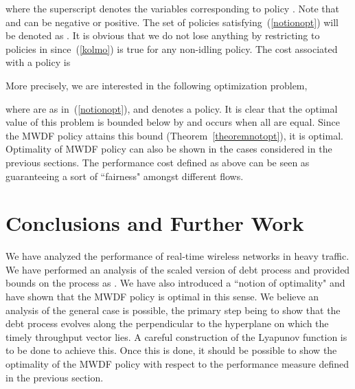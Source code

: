\documentclass[letterpaper, 10 pt, conference]{ieeeconf}
\begin{document}
where the superscript denotes the variables corresponding to policy . Note that  and  can be negative or positive. The set of policies satisfying~(\ref{notionopt}) will be denoted as . It is obvious that we do not lose anything by restricting to policies in  since~(\ref{kolmo}) is true for any non-idling policy. The cost associated with a policy is
 
More precisely, we are interested in the following optimization problem,

where  are as in~(\ref{notionopt}), and  denotes a policy. It is clear that the optimal value of this problem is bounded below by  and occurs when all  are equal. Since the MWDF policy attains this bound (Theorem~\ref{theoremnotopt}), it is optimal.\\
Optimality of MWDF policy can also be shown in the cases considered in the previous sections. The performance cost defined as above can be seen as guaranteeing a sort of ``fairness" amongst different flows.
\section{Conclusions and Further Work}\label{sec:conclusion} 
 We have analyzed the performance of real-time wireless networks in heavy traffic. We have performed an analysis of the scaled version of debt process and provided bounds on the process as . We have also introduced a ``notion of optimality" and have shown that the MWDF policy is optimal in this sense. We believe an analysis of the general case is possible, the primary step being to show that the debt process evolves along the perpendicular to the hyperplane on which the timely throughput vector lies. A careful construction of the Lyapunov function is to be done to achieve this. Once this is done, it should be possible to show the optimality of the MWDF policy with respect to the performance measure defined in the previous section.












\end{document}
